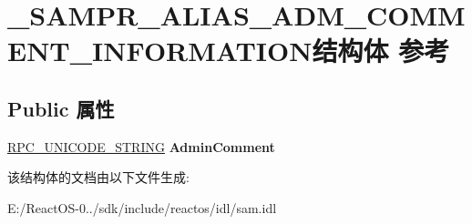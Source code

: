 \hypertarget{struct___s_a_m_p_r___a_l_i_a_s___a_d_m___c_o_m_m_e_n_t___i_n_f_o_r_m_a_t_i_o_n}{}\section{\+\_\+\+S\+A\+M\+P\+R\+\_\+\+A\+L\+I\+A\+S\+\_\+\+A\+D\+M\+\_\+\+C\+O\+M\+M\+E\+N\+T\+\_\+\+I\+N\+F\+O\+R\+M\+A\+T\+I\+O\+N结构体 参考}
\label{struct___s_a_m_p_r___a_l_i_a_s___a_d_m___c_o_m_m_e_n_t___i_n_f_o_r_m_a_t_i_o_n}
\subsection*{Public 属性}
\begin{DoxyCompactItemize}
\item 
\mbox{\label{struct___s_a_m_p_r___a_l_i_a_s___a_d_m___c_o_m_m_e_n_t___i_n_f_o_r_m_a_t_i_o_n_add6550da68aeceb082c2425994e84f1f}} 
\hyperlink{struct___r_p_c___u_n_i_c_o_d_e___s_t_r_i_n_g}{R\+P\+C\+\_\+\+U\+N\+I\+C\+O\+D\+E\+\_\+\+S\+T\+R\+I\+NG} {\bfseries Admin\+Comment}
\end{DoxyCompactItemize}


该结构体的文档由以下文件生成\+:\begin{DoxyCompactItemize}
\item 
E\+:/\+React\+O\+S-\/0../sdk/include/reactos/idl/sam.\+idl\end{DoxyCompactItemize}
